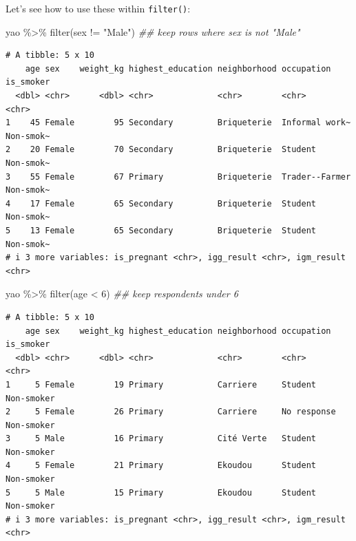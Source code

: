 \documentclass[
  letterpaper,
  DIV=11,
  numbers=noendperiod]{scrreprt}
\newenvironment{Shaded}{\begin{snugshade}}{\end{snugshade}}
\newcommand{\DecValTok}[1]{\textcolor[rgb]{0.68,0.00,0.00}{#1}}
\newcommand{\DocumentationTok}[1]{\textcolor[rgb]{0.37,0.37,0.37}{\textit{#1}}}
\newcommand{\FunctionTok}[1]{\textcolor[rgb]{0.28,0.35,0.67}{#1}}
\newcommand{\NormalTok}[1]{\textcolor[rgb]{0.00,0.23,0.31}{#1}}
\newcommand{\SpecialCharTok}[1]{\textcolor[rgb]{0.37,0.37,0.37}{#1}}
\newcommand{\StringTok}[1]{\textcolor[rgb]{0.13,0.47,0.30}{#1}}
\begin{document}
Let's see how to use these within \texttt{filter()}:

\begin{Shaded}
\begin{Highlighting}[]
\NormalTok{yao }\SpecialCharTok{\%\textgreater{}\%} \FunctionTok{filter}\NormalTok{(sex }\SpecialCharTok{!=} \StringTok{"Male"}\NormalTok{) }\DocumentationTok{\#\# keep rows where \textasciigrave{}sex\textasciigrave{} is not "Male"}
\end{Highlighting}
\end{Shaded}

\begin{verbatim}
# A tibble: 5 x 10
    age sex    weight_kg highest_education neighborhood occupation     is_smoker
  <dbl> <chr>      <dbl> <chr>             <chr>        <chr>          <chr>    
1    45 Female        95 Secondary         Briqueterie  Informal work~ Non-smok~
2    20 Female        70 Secondary         Briqueterie  Student        Non-smok~
3    55 Female        67 Primary           Briqueterie  Trader--Farmer Non-smok~
4    17 Female        65 Secondary         Briqueterie  Student        Non-smok~
5    13 Female        65 Secondary         Briqueterie  Student        Non-smok~
# i 3 more variables: is_pregnant <chr>, igg_result <chr>, igm_result <chr>
\end{verbatim}

\begin{Shaded}
\begin{Highlighting}[]
\NormalTok{yao }\SpecialCharTok{\%\textgreater{}\%} \FunctionTok{filter}\NormalTok{(age }\SpecialCharTok{\textless{}} \DecValTok{6}\NormalTok{) }\DocumentationTok{\#\# keep respondents under 6}
\end{Highlighting}
\end{Shaded}

\begin{verbatim}
# A tibble: 5 x 10
    age sex    weight_kg highest_education neighborhood occupation  is_smoker 
  <dbl> <chr>      <dbl> <chr>             <chr>        <chr>       <chr>     
1     5 Female        19 Primary           Carriere     Student     Non-smoker
2     5 Female        26 Primary           Carriere     No response Non-smoker
3     5 Male          16 Primary           Cité Verte   Student     Non-smoker
4     5 Female        21 Primary           Ekoudou      Student     Non-smoker
5     5 Male          15 Primary           Ekoudou      Student     Non-smoker
# i 3 more variables: is_pregnant <chr>, igg_result <chr>, igm_result <chr>
\end{verbatim}
\end{document}
